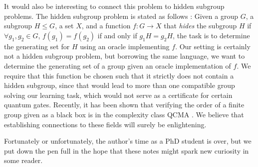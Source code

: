 \documentclass[../main.tex]{subfiles}
\begin{document}
It would also be interesting to connect this problem to hidden subgroup problems. The hidden subgroup problem is stated as follows \cite{lomont2004the}: Given a group $G$, a subgroup $H \leq G$, a set $X$, and a function $f: G \to X$ that \textit{hides} the subgroup $H$ if $\forall g_1, g_2 \in G$, $f(g_1) = f(g_2)$ if and only if $g_1H = g_2H$, the task is to determine the generating set for $H$ using an oracle implementing $f$.
Our setting is certainly not a hidden subgroup problem, but borrowing the same language, we want to determine the generating set of a group given an oracle implementation of $f$. We require that this function be chosen such that it strictly does not contain a hidden subgroup, since that would lead to more than one compatible group solving our learning task, which would not serve as a certificate for certain quantum gates. Recently, it has been shown that verifying the order of a finite group given as a black box is in the complexity class QCMA \cite{gall2025group}. We believe that establishing connections to these fields will surely be enlightening.

Fortunately or unfortunately, the author's time as a PhD student is over, but we put down the pen full in the hope that these notes might spark new curiosity in some reader.

%
\end{document}

